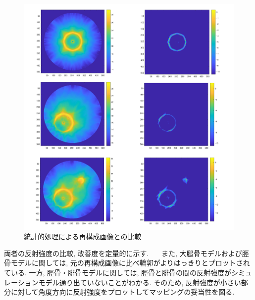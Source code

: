 \begin{figure}[H]
  \begin{center}
    \includegraphics[width=140mm]{fig/gassanhikaku.pdf}
  \end{center}
  \caption{統計的処理による再構成画像との比較}
\end{figure}
両者の反射強度の比較, 改善度を定量的に示す. 
\ \ \ また, 大腿骨モデルおよび脛骨モデルに関しては, 元の再構成画像に比べ輪郭がよりはっきりとプロットされている. 一方, 脛骨・腓骨モデルに関しては, 脛骨と腓骨の間の反射強度がシミュレーションモデル通り出ていないことがわかる. そのため, 反射強度が小さい部分に対して角度方向に反射強度をプロットしてマッピングの妥当性を図る. 